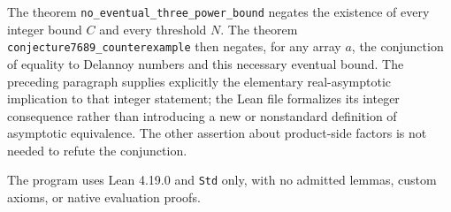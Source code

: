 \documentclass[10pt]{article}
\begin{document}
The theorem \texttt{no\_eventual\_three\_power\_bound} negates the existence
of every integer bound $C$ and every threshold $N$. The theorem
\texttt{conjecture7689\_counterexample} then negates, for any array $a$,
the conjunction of equality to Delannoy numbers and this necessary
eventual bound. The preceding paragraph supplies explicitly the elementary
real-asymptotic implication to that integer statement; the Lean file
formalizes its integer consequence rather than introducing a new or
nonstandard definition of asymptotic equivalence. The other assertion
about product-side factors is not needed to refute the conjunction.

The program uses Lean 4.19.0 and \texttt{Std} only, with no admitted lemmas,
custom axioms, or native evaluation proofs.
\end{document}
